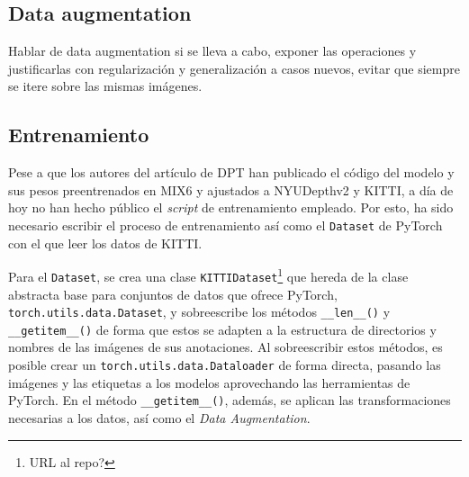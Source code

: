\subsection{Data augmentation}
Hablar de data augmentation si se lleva a cabo, exponer las operaciones y justificarlas con regularización y generalización a casos nuevos, evitar que siempre se itere sobre las mismas imágenes.

\subsection{Entrenamiento}
Pese a que los autores del artículo de DPT \cite{} han publicado el código del modelo y sus pesos preentrenados en MIX6 y ajustados a NYUDepthv2 y KITTI, a día de hoy no han hecho público el \textit{script} de entrenamiento empleado. Por esto, ha sido necesario escribir el proceso de entrenamiento así como el \texttt{Dataset} de PyTorch con el que leer los datos de KITTI.

Para el \texttt{Dataset}, se crea una clase \texttt{KITTIDataset}\footnote{URL al repo?} que hereda de la clase abstracta base para conjuntos de datos que ofrece PyTorch, \texttt{torch.utils.data.Dataset}, y sobreescribe los métodos \texttt{\_\_len\_\_()} y \texttt{\_\_getitem\_\_()} de forma que estos se adapten a la estructura de directorios y nombres de las imágenes de sus anotaciones. Al sobreescribir estos métodos, es posible crear un \texttt{torch.utils.data.Dataloader} de forma directa, pasando las imágenes y las etiquetas a los modelos aprovechando las herramientas de PyTorch. En el método \texttt{\_\_getitem\_\_()}, además, se aplican las transformaciones necesarias a los datos, así como el \textit{Data Augmentation}.

